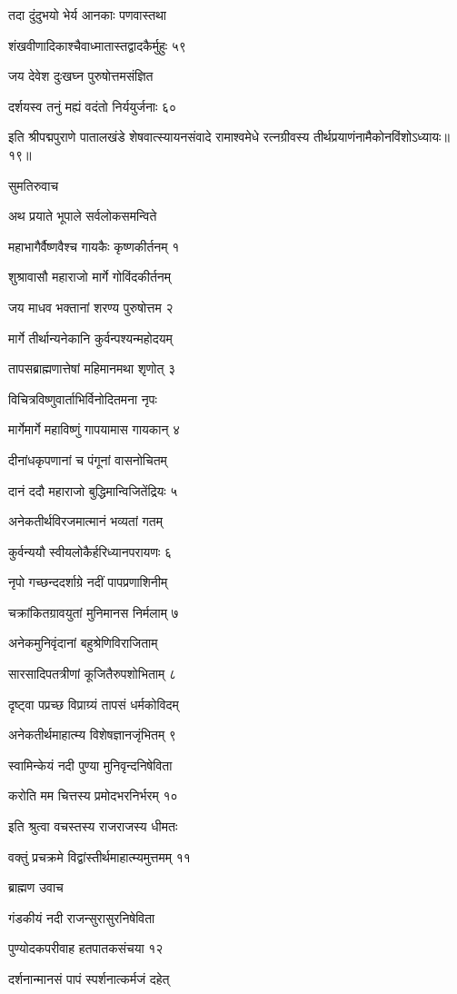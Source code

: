 तदा दुंदुभयो भेर्य आनकाः पणवास्तथा

शंखवीणादिकाश्चैवाध्मातास्तद्वादकैर्मुहुः ५९

जय देवेश दुःखघ्न पुरुषोत्तमसंज्ञित

दर्शयस्व तनुं मह्यं वदंतो निर्ययुर्जनाः ६०

इति श्रीपद्मपुराणे पातालखंडे शेषवात्स्यायनसंवादे रामाश्वमेधे रत्नग्रीवस्य तीर्थप्रयाणंनामैकोनविंशोऽध्यायः॥१९॥


सुमतिरुवाच

अथ प्रयाते भूपाले सर्वलोकसमन्विते

महाभागैर्वैष्णवैश्च गायकैः कृष्णकीर्तनम् १

शुश्रावासौ महाराजो मार्गे गोविंदकीर्तनम्

जय माधव भक्तानां शरण्य पुरुषोत्तम २

मार्गे तीर्थान्यनेकानि कुर्वन्पश्यन्महोदयम्

तापसब्राह्मणात्तेषां महिमानमथा शृणोत् ३

विचित्रविष्णुवार्ताभिर्विनोदितमना नृपः

मार्गेमार्गे महाविष्णुं गापयामास गायकान् ४

दीनांधकृपणानां च पंगूनां वासनोचितम्

दानं ददौ महाराजो बुद्धिमान्विजितेंद्रियः ५

अनेकतीर्थविरजमात्मानं भव्यतां गतम्

कुर्वन्ययौ स्वीयलोकैर्हरिध्यानपरायणः ६

नृपो गच्छन्ददर्शाग्रे नदीं पापप्रणाशिनीम्

चक्रांकितग्रावयुतां मुनिमानस निर्मलाम् ७

अनेकमुनिवृंदानां बहुश्रेणिविराजिताम्

सारसादिपतत्रीणां कूजितैरुपशोभिताम् ८

दृष्ट्वा पप्रच्छ विप्राग्र्यं तापसं धर्मकोविदम्

अनेकतीर्थमाहात्म्य विशेषज्ञानजृंभितम् ९

स्वामिन्केयं नदी पुण्या मुनिवृन्दनिषेविता

करोति मम चित्तस्य प्रमोदभरनिर्भरम् १०

इति श्रुत्वा वचस्तस्य राजराजस्य धीमतः

वक्तुं प्रचक्रमे विद्वांस्तीर्थमाहात्म्यमुत्तमम् ११

ब्राह्मण उवाच

गंडकीयं नदी राजन्सुरासुरनिषेविता

पुण्योदकपरीवाह हतपातकसंचया १२

दर्शनान्मानसं पापं स्पर्शनात्कर्मजं दहेत्

